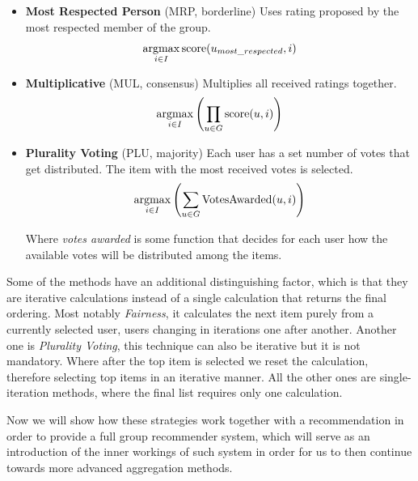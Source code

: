\begin{itemize}
    \item \textbf{Most Respected Person} (MRP, borderline)\newline
        Uses rating proposed by the most respected member of the group.
        \begin{equation}
            \operatorname*{argmax}_{i \in I}{\textrm{score}(u_{most\_respected},i)}
        \end{equation}
        
        
    \item \textbf{Multiplicative} (MUL, consensus)\newline
        Multiplies all received ratings together.
        \begin{equation}
            \operatorname*{argmax}_{i \in I}{\left(\prod_{u \in G}{\textrm{score}(u,i)}\right)}
        \end{equation}
        
        
    \item \textbf{Plurality Voting} (PLU, majority)\newline
        Each user has a set number of votes that get distributed. The item with the most received votes is selected.
        \begin{equation}
            \operatorname*{argmax}_{i \in I}{\left(\sum_{u \in G}{\textrm{VotesAwarded}(u,i)}\right)}
        \end{equation}
        
        Where \textit{votes awarded} is some function that decides for each user how the available votes will be distributed among the items.
        
\end{itemize}

Some of the methods have an additional distinguishing factor, which is that they are iterative calculations instead of a single calculation that returns the final ordering. Most notably \textit{Fairness}, it calculates the next item purely from a currently selected user, users changing in iterations one after another. Another one is \textit{Plurality Voting}, this technique can also be iterative but it is not mandatory. Where after the top item is selected we reset the calculation, therefore selecting top items in an iterative manner. All the other ones are single-iteration methods, where the final list requires only one calculation.

Now we will show how these strategies work together with a recommendation in order to provide a full group recommender system, which will serve as an introduction of the inner workings of such system in order for us to then continue towards more advanced aggregation methods.

